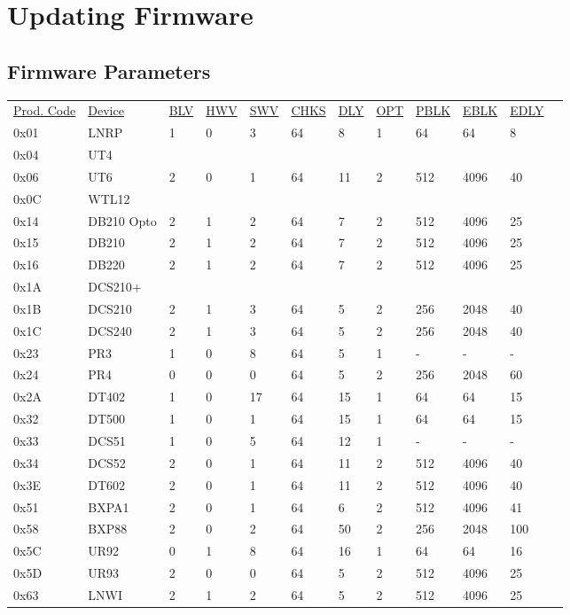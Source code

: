  

\chapter[Updating Firmware]{Updating Firmware}

\section{Firmware Parameters}

\begin{tabular}{l l l l l l l l l l l l}
\underline{Prod. Code} & \underline{Device} & \underline{BLV} & \underline{HWV} & \underline{SWV} & \underline{CHKS} & \underline{DLY} & \underline{OPT} & \underline{PBLK} & \underline{EBLK} & \underline{EDLY}\\
0x01 & LNRP & 1 & 0 & 3 & 64 & 8 & 1 & 64 & 64 & 8\\
0x04 & UT4\\
0x06 & UT6 & 2 & 0 & 1 & 64 & 11 & 2 & 512 & 4096 & 40\\
0x0C & WTL12\\
0x14 & DB210 Opto & 2 & 1 & 2 & 64 & 7 & 2 & 512 & 4096 & 25\\
0x15 & DB210 & 2 & 1 & 2 & 64 & 7 & 2 & 512 & 4096 & 25\\
0x16 & DB220 & 2 & 1 & 2 & 64 & 7 & 2 & 512 & 4096 & 25\\
0x1A & DCS210+\\
0x1B & DCS210 & 2 & 1 & 3 & 64 & 5 & 2 & 256 & 2048 & 40\\
0x1C & DCS240 & 2 & 1 & 3 & 64 & 5 & 2 & 256 & 2048 & 40\\
0x23 & PR3 & 1 & 0 & 8 & 64 & 5 & 1 & - & - & -\\
0x24 & PR4 & 0 & 0 & 0 & 64 & 5 & 2 & 256 & 2048 & 60\\
0x2A & DT402 & 1 & 0 & 17 & 64 & 15 & 1 & 64 & 64 & 15\\
0x32 & DT500 & 1 & 0 & 1 & 64 & 15 & 1 & 64 & 64 & 15\\
0x33 & DCS51 & 1 & 0 & 5 & 64 & 12 & 1 & - & - & -\\
0x34 & DCS52 & 2 & 0 & 1 & 64 & 11 & 2 & 512 & 4096 & 40\\
0x3E & DT602 & 2 & 0 & 1 & 64 & 11 & 2 & 512 & 4096 & 40\\
0x51 & BXPA1 & 2 & 0 & 1 & 64 & 6 & 2 & 512 & 4096 & 41\\
0x58 & BXP88 & 2 & 0 & 2 & 64 & 50 & 2 & 256 & 2048 & 100\\
0x5C & UR92 & 0 & 1 & 8 & 64 & 16 & 1 & 64 & 64 & 16\\
0x5D & UR93 & 2 & 0 & 0 & 64 & 5 & 2 & 512 & 4096 & 25\\
0x63 & LNWI & 2 & 1 & 2 & 64 & 5 & 2 & 512 & 4096 & 25\\
\end{tabular}

